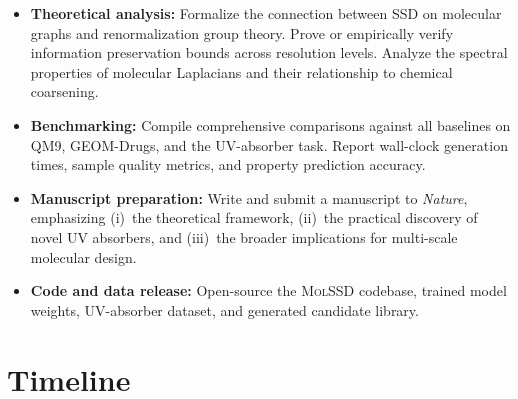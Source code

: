 \documentclass[11pt,a4paper]{article}
\newcommand{\molssd}{\textsc{MolSSD}}
\begin{document}
\begin{itemize}[leftmargin=*]
  \item \textbf{Theoretical analysis:} Formalize the connection between SSD on molecular
    graphs and renormalization group theory. Prove or empirically verify information
    preservation bounds across resolution levels. Analyze the spectral properties of
    molecular Laplacians and their relationship to chemical coarsening.

  \item \textbf{Benchmarking:} Compile comprehensive comparisons against all baselines
    on QM9, GEOM-Drugs, and the UV-absorber task. Report wall-clock generation times,
    sample quality metrics, and property prediction accuracy.

  \item \textbf{Manuscript preparation:} Write and submit a manuscript to \textit{Nature},
    emphasizing (i)~the theoretical framework, (ii)~the practical discovery of novel UV
    absorbers, and (iii)~the broader implications for multi-scale molecular design.

  \item \textbf{Code and data release:} Open-source the \molssd{} codebase, trained model
    weights, UV-absorber dataset, and generated candidate library.
\end{itemize}


\section{Timeline}
\end{document}
